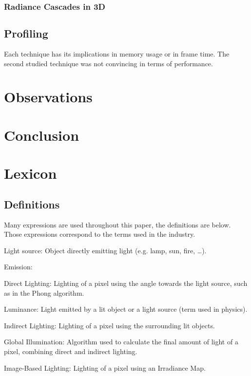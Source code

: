 \documentclass{rapportCS}
\begin{document}
\subsubsection{Radiance Cascades in 3D}

\subsection{Profiling}
Each technique has its implications in memory usage or in frame time.
The second studied technique was not convincing in terms of performance. 


\section{Observations}

\section{Conclusion}

\section*{Lexicon}


\subsection*{Definitions}

Many expressions are used throughout this paper, the definitions are below. Those expressions correspond to the terms used in the industry.

Light source: Object directly emitting light (e.g. lamp, sun, fire, …).

Emission:

Direct Lighting: Lighting of a pixel using the angle towards the light source, such as in the Phong algorithm.

Luminance: Light emitted by a lit object or a light source (term used in physics).

Indirect Lighting: Lighting of a pixel using the surrounding lit objects.

Global Illumination: Algorithm used to calculate the final amount of light of a pixel, combining direct and indirect lighting.

Image-Based Lighting: Lighting of a pixel using an Irradiance Map.
\end{document}
